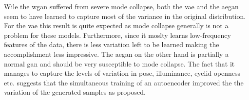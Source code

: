 Wile the \acrshort{wgan} suffered from severe mode collapse, both the \acrshort{vae} and the \acrshort{aegan} seem to have learned to capture most of the variance in the original distribution. For the \acrshort{vae} this result is quite expected as mode collapse generally is not a problem for these models. Furthermore, since it moslty learns low-frequency features of the data, there is less variation left to be learned making the accomplishment less impressive. The \acrshort{aegan} on the other hand is partially a normal \acrshort{gan} and should be very susceptible to mode collapse. The fact that it manages to capture the levels of variation in pose, illuminance, eyelid openness etc. suggests that the simultaneous training of an autoencoder improved the the variation of the generated samples as proposed.





